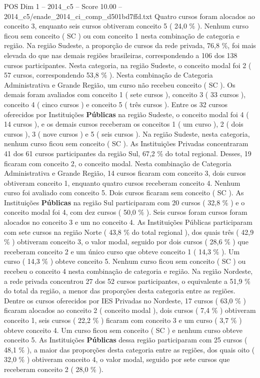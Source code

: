 \begin{textsample}{POS Dim 1 – 2014\_c5 – Score 10.00 – 2014\_c5/enade\_2014\_ci\_comp\_d501bd7ffd.txt}
Quatro cursos foram alocados ao conceito 3, enquanto seis cursos obtiveram conceito 5 ( 24,0 \% ).
Nenhum curso ficou sem conceito ( SC ) ou com conceito 1 nesta combinação de categoria e região.
Na região Sudeste, a proporção de cursos da rede privada, 76,8 \%, foi mais elevada do que nas demais regiões brasileiras, correspondendo a 106 dos 138 cursos participantes.
Nesta categoria, na região Sudeste, o conceito modal foi 2 ( 57 cursos, correspondendo 53,8 \% ).
Nesta combinação de Categoria Administrativa e Grande Região, um curso não recebeu conceito ( SC ).
Os demais foram avaliados com conceito 1 ( sete cursos ), conceito 3 ( 33 cursos ), conceito 4 ( cinco cursos ) e conceito 5 ( três cursos ).
Entre os 32 cursos oferecidos por Instituições \textbf{Públicas} na região Sudeste, o conceito modal foi 4 ( 14 cursos ), e os demais cursos receberam os conceitos 1 ( um curso ), 2 ( dois cursos ), 3 ( nove cursos ) e 5 ( seis cursos ).
Na região Sudeste, nesta categoria, nenhum curso ficou sem conceito ( SC ).
As Instituições Privadas concentraram 41 dos 61 cursos participantes da região Sul, 67,2 \% do total regional.
Desses, 19 ficaram com conceito 2, o conceito modal.
Nesta combinação de Categoria Administrativa e Grande Região, 14 cursos ficaram com conceito 3, dois cursos obtiveram conceito 1, enquanto quatro cursos receberam conceito 4.
Nenhum curso foi avaliado com conceito 5.
Dois cursos ficaram sem conceito ( SC ).
As Instituições \textbf{Públicas} na região Sul participaram com 20 cursos ( 32,8 \% ) e o conceito modal foi 4, com dez cursos ( 50,0 \% ).
Seis cursos foram cursos foram alocados no conceito 3 e um no conceito 4.
As Instituições Públicas participaram com sete cursos na região Norte ( 43,8 \% do total regional ), dos quais três ( 42,9 \% ) obtiveram conceito 3, o valor modal, seguido por dois cursos ( 28,6 \% ) que receberam conceito 2 e um único curso que obteve conceito 1 ( 14,3 \% ).
Um curso ( 14,3 \% ) obteve conceito 5.
Nenhum curso ficou sem conceito ( SC ) ou recebeu o conceito 4 nesta combinação de categoria e região.
Na região Nordeste, a rede privada concentrou 27 dos 52 cursos participantes, o equivalente a 51,9 \% do total da região, a menor das proporções desta categoria entre as regiões.
Dentre os cursos oferecidos por IES Privadas no Nordeste, 17 cursos ( 63,0 \% ) ficaram alocados ao conceito 2 ( conceito modal ), dois cursos ( 7,4 \% ) obtiveram conceito 1, seis cursos ( 22,2 \% ) ficaram com conceito 3 e um curso ( 3,7 \% ) obteve conceito 4.
Um curso ficou sem conceito ( SC ) e nenhum curso obteve conceito 5.
As Instituições \textbf{Públicas} dessa região participaram com 25 cursos ( 48,1 \% ), a maior das proporções desta categoria entre as regiões, dos quais oito ( 32,0 \% ) obtiveram conceito 4, o valor modal, seguido por sete cursos que receberam conceito 2 ( 28,0 \% ).

\end{textsample}
